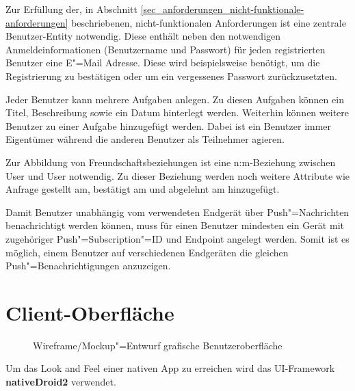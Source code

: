 Zur Erfüllung der, in Abschnitt \ref{sec_anforderungen_nicht-funktionale-anforderungen} beschriebenen, nicht-funktionalen Anforderungen ist eine zentrale Benutzer-Entity notwendig. Diese enthält neben den notwendigen Anmeldeinformationen (Benutzername und Passwort) für jeden registrierten Benutzer eine E"=Mail Adresse. Diese wird beispielsweise benötigt, um die Registrierung zu bestätigen oder um ein vergessenes Passwort zurückzusetzten. 

Jeder Benutzer kann mehrere Aufgaben anlegen. Zu diesen Aufgaben können ein Titel, Beschreibung sowie ein Datum hinterlegt werden. Weiterhin können weitere Benutzer zu einer Aufgabe hinzugefügt werden. Dabei ist ein Benutzer immer \glqq{}Eigentümer\grqq{} während die anderen Benutzer als \glqq{}Teilnehmer\grqq{} agieren.

Zur Abbildung von Freundschaftsbeziehungen ist eine n:m-Beziehung zwischen User und User notwendig. Zu dieser Beziehung werden noch weitere Attribute wie \glqq{}Anfrage gestellt am\grqq{}, \glqq{}bestätigt am\grqq{} und \glqq{}abgelehnt am\grqq{} hinzugefügt.

Damit Benutzer unabhängig vom verwendeten Endgerät über Push"=Nachrichten benachrichtigt werden können, muss für einen Benutzer mindesten ein Gerät mit zugehöriger Push"=Subscription"=ID und Endpoint angelegt werden. Somit ist es möglich, einem Benutzer auf verschiedenen Endgeräten die gleichen Push"=Benachrichtigungen anzuzeigen.

\section{Client-Oberfläche}
\label{sec_konzeption_client-ui}

\begin{figure}[htp] 
\caption{Wireframe/Mockup"=Entwurf grafische Benutzeroberfläche}
\label{image_konzeption_datenmodell}
\end{figure} 


Um das \glqq{}Look and Feel\grqq{} einer nativen App zu erreichen wird das UI-Framework \textbf{nativeDroid2} verwendet. \\
